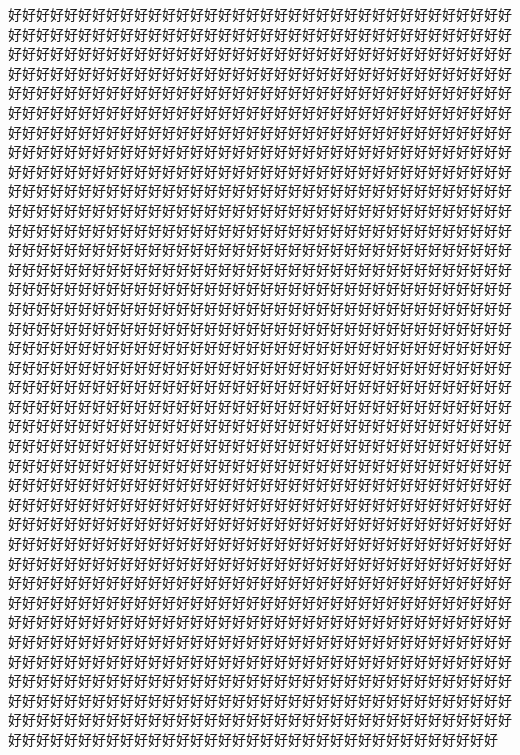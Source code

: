 好好好好好好好好好好好好好好好好好好好好好好好好好好好好好好好好好好好好好好好好好好好好好好好好好好好好好好好好好好好好好好好好好好好好好好好好好好好好好好好好好好好好好好好好好好好好好好好好好好好好好好好好好好好好好好好好好好好好好好好好好好好好好好好好好好好好好好好好好好好好好好好好好好好好好好好好好好好好好好好好好好好好好好好好好好好好好好好好好好好好好好好好好好好好好好好好好好好好好好好好好好好好好好好好好好好好好好好好好好好好好好好好好好好好好好好好好好好好好好好好好好好好好好好好好好好好好好好好好好好好好好好好好好好好好好好好好好好好好好好好好好好好好好好好好好好好好好好好好好好好好好好好好好好好好好好好好好好好好好好好好好好好好好好好好好好好好好好好好好好好好好好好好好好好好好好好好好好好好好好好好好好好好好好好好好好好好好好好好好好好好好好好好好好好好好好好好好好好好好好好好好好好好好好好好好好好好好好好好好好好好好好好好好好好好好好好好好好好好好好好好好好好好好好好好好好好好好好好好好好好好好好好好好好好好好好好好好好好好好好好好好好好好好好好好好好好好好好好好好好好好好好好好好好好好好好好好好好好好好好好好好好好好好好好好好好好好好好好好好好好好好好好好好好好好好好好好好好好好好好好好好好好好好好好好好好好好好好好好好好好好好好好好好好好好好好好好好好好好好好好好好好好好好好好好好好好好好好好好好好好好好好好好好好好好好好好好好好好好好好好好好好好好好好好好好好好好好好好好好好好好好好好好好好好好好好好好好好好好好好好好好好好好好好好好好好好好好好好好好好好好好好好好好好好好好好好好好好好好好好好好好好好好好好好好好好好好好好好好好好好好好好好好好好好好好好好好好好好好好好好好好好好好好好好好好好好好好好好好好好好好好好好好好好好好好好好好好好好好好好好好好好好好好好好好好好好好好好好好好好好好好好好好好好好好好好好好好好好好好好好好好好好好好好好好好好好好好好好好好好好好好好好好好好好好好好好好好好好好好好好好好好好好好好好好好好好好好好好好好好好好好好好好好好好好好好好好好好好好好好好好好好好好好好好好好好好好好好好好好好好好好好好好好好好好好好好好好好好好好好好好好好好好好好好好好好好好好好好好好好好好好好好好好好好好好好好好好好好好好好好好好好好好好好好好好好好好好好好好好好好好好好好好好好好好好好好好好好好好好好好好好好好好好好好好好好好好好好好好好好好好好好好好好好好好好好好好好好好好好好好好好好好好好好好好好好好好好好好好好好好好好好好好好好好好好好好好好好好好好好好好好好好好好好好好好好好好好好好好好好好好好好好好好好好好好好好好好好好好好好好好好好好好好好好好好好好好好好好好好好好好好好好好好好好好好好好好好好好好好好好好好好好好好好好好好好好好好好好好好好好好好好好好好好好好好好好好好好好好好好好好好好好好好好好好好好好好好好好好好好好好好好好好好好好好好好好好好好好好好好好好好好好好好好好好好好好好好好好好好好好好好好好好好好好好好好好好好好好好好好好好好好好好好好好好好好好好好好好好好好好好好好好好好好好好好好好好好好好好好好好好好好好好好好